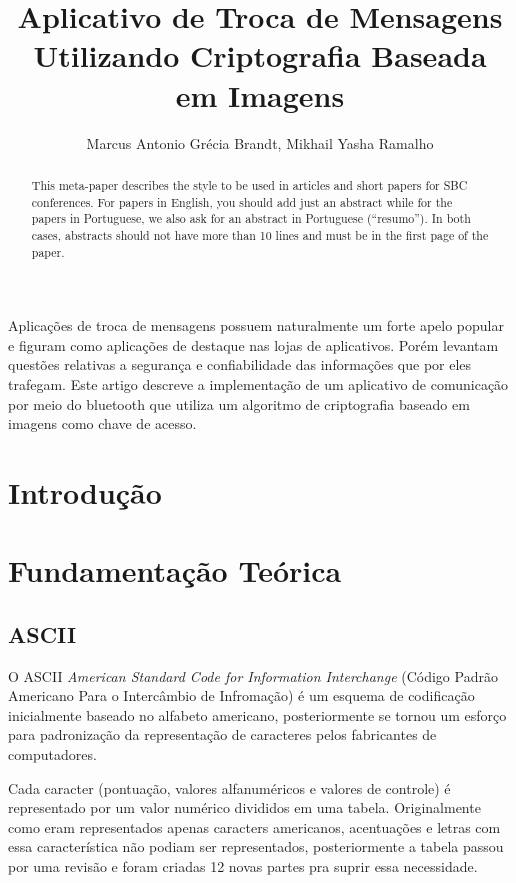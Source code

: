 \documentclass[12pt]{article}
\title{Aplicativo de Troca de Mensagens Utilizando Criptografia Baseada em
Imagens}
\author{Marcus Antonio Grécia Brandt\inst{1}, Mikhail Yasha Ramalho \inst{1}}
\begin{document}
 

\maketitle

\begin{abstract}
  This meta-paper describes the style to be used in articles and short papers
  for SBC conferences. For papers in English, you should add just an abstract
  while for the papers in Portuguese, we also ask for an abstract in
  Portuguese (``resumo''). In both cases, abstracts should not have more than
  10 lines and must be in the first page of the paper.
\end{abstract}
     
\begin{resumo} 
  Aplicações de troca de mensagens possuem naturalmente um forte apelo popular
  e figuram como aplicações de destaque nas lojas de aplicativos. Porém levantam
  questões relativas a segurança e confiabilidade das informações que por eles
  trafegam. Este artigo descreve a implementação de um aplicativo de comunicação
  por meio do bluetooth que utiliza um algoritmo de criptografia baseado em
  imagens como chave de acesso.
\end{resumo}

\section{Introdução}

\section{Fundamentação Teórica} \label{sec:fundamentacao}

\subsection{ASCII}
O ASCII \textit{American Standard Code for Information Interchange} (Código Padrão Americano Para o Intercâmbio de Infromação) é um esquema de codificação inicialmente baseado no alfabeto americano, posteriormente se tornou um esforço para padronização da representação de caracteres pelos fabricantes de computadores.

Cada caracter (pontuação, valores alfanuméricos e valores de controle) é representado por um valor numérico divididos em uma tabela. Originalmente como eram representados apenas caracters americanos, acentuações e letras com essa característica não podiam ser representados, posteriormente a tabela passou por uma revisão e foram criadas 12 novas partes pra suprir essa necessidade.
\end{document}
